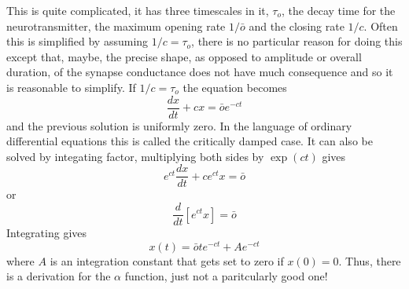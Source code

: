 \documentclass[11pt,a4paper]{scrartcl}
\begin{document}
This is quite complicated, it has three timescales in it, $\tau_o$,
the decay time for the neurotransmitter, the maximum opening rate
$1/\bar{o}$ and the closing rate $1/c$. Often this is simplified by
assuming $1/c=\tau_o$, there is no particular reason for doing this
except that, maybe, the precise shape, as opposed to amplitude or
overall duration, of the synapse conductance does not have much
consequence and so it is reasonable to simplify. If $1/c=\tau_o$ the
equation becomes
\begin{equation}
\frac{dx}{dt}+cx=\bar{o}e^{-ct}
\end{equation}
and the previous solution is uniformly zero. In the language of
ordinary differential equations this is called the critically damped
case. It can also be solved by integating factor, multiplying both
sides by $\exp{(ct)}$ gives
\begin{equation}
e^{ct}\frac{dx}{dt}+ce^{ct}x=\bar{o}
\end{equation}
or
\begin{equation}
\frac{d}{dt}\left[e^{ct}x\right]=\bar{o}
\end{equation}
Integrating gives
\begin{equation}
x(t)=\bar{o}te^{-ct}+Ae^{-ct}
\end{equation}
where $A$ is an integration constant that gets set to zero if
$x(0)=0$. Thus, there is a derivation for the $\alpha$ function, just not a paritcularly good one!
\end{document}
